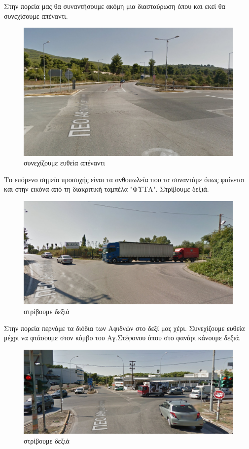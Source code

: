 Στην πορεία μας θα συναντήσουμε ακόμη μια διασταύρωση όπου και εκεί θα συνεχίσουμε απέναντι.
\begin{figure}[H]
\includegraphics[width=\textwidth]{images/lamia-athina/afidnon/afidnon_025.jpg} 
\caption{συνεχίζουμε ευθεία απέναντι}
\end{figure}
Το επόμενο σημείο προσοχής είναι τα ανθοπωλεία που τα συναντάμε όπως φαίνεται και στην εικόνα από τη διακριτική ταμπέλα "ΦΥΤΑ". Στρίβουμε δεξιά.
\begin{figure}[H]
\includegraphics[width=\textwidth]{images/lamia-athina/afidnon/afidnon_026.jpg} 
\caption{στρίβουμε δεξιά}
\end{figure}
Στην πορεία περνάμε τα διόδια των Αφιδνών στο δεξί μας χέρι. Συνεχίζουμε ευθεία μέχρι να φτάσουμε στον κόμβο του Αγ.Στέφανου όπου στο φανάρι κάνουμε δεξιά.
\begin{figure}[H]
\includegraphics[width=\textwidth]{images/lamia-athina/afidnon/afidnon_027.jpg} 
\caption{στρίβουμε δεξιά}
\end{figure}

